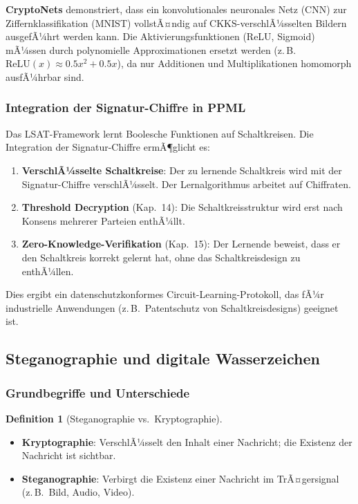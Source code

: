 ﻿\documentclass[a4paper,12pt]{scrreprt}
\theoremstyle{definition}
\newtheorem{definition}{Definition}[section]
\begin{document}
\textbf{CryptoNets} \cite{GLP+21} demonstriert, dass ein konvolutionales neuronales Netz (CNN) zur Ziffernklassifikation (MNIST) vollstÃ¤ndig auf CKKS-verschlÃ¼sselten Bildern ausgefÃ¼hrt werden kann. Die Aktivierungsfunktionen (ReLU, Sigmoid) mÃ¼ssen durch polynomielle Approximationen ersetzt werden (z.\,B.\ $\mathrm{ReLU}(x) \approx 0.5x^2 + 0.5x$), da nur Additionen und Multiplikationen homomorph ausfÃ¼hrbar sind.

\subsubsection{Integration der Signatur-Chiffre in PPML}

Das LSAT-Framework \cite{Epp26d} lernt Boolesche Funktionen auf Schaltkreisen. Die Integration der Signatur-Chiffre ermÃ¶glicht es:

\begin{enumerate}
    \item \textbf{VerschlÃ¼sselte Schaltkreise}: Der zu lernende Schaltkreis wird mit der Signatur-Chiffre verschlÃ¼sselt. Der Lernalgorithmus arbeitet auf Chiffraten.
    \item \textbf{Threshold Decryption} (Kap.~14): Die Schaltkreisstruktur wird erst nach Konsens mehrerer Parteien enthÃ¼llt.
    \item \textbf{Zero-Knowledge-Verifikation} (Kap.~15): Der Lernende beweist, dass er den Schaltkreis korrekt gelernt hat, ohne das Schaltkreisdesign zu enthÃ¼llen.
\end{enumerate}

Dies ergibt ein datenschutzkonformes Circuit-Learning-Protokoll, das fÃ¼r industrielle Anwendungen (z.\,B.\ Patentschutz von Schaltkreisdesigns) geeignet ist.

\subsection{Steganographie und digitale Wasserzeichen}

\subsubsection{Grundbegriffe und Unterschiede}

\begin{definition}[Steganographie vs.\ Kryptographie]
\begin{itemize}
    \item \textbf{Kryptographie}: VerschlÃ¼sselt den Inhalt einer Nachricht; die Existenz der Nachricht ist sichtbar.
    \item \textbf{Steganographie}: Verbirgt die Existenz einer Nachricht im TrÃ¤gersignal (z.\,B.\ Bild, Audio, Video).
\end{itemize}
\end{definition}
\end{document}
